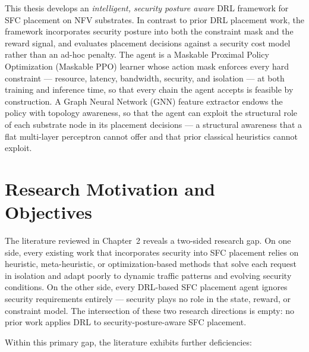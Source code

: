 This thesis develops an \emph{intelligent, security posture aware} DRL
framework for SFC placement on NFV substrates. In contrast to prior DRL
placement work, the framework incorporates security posture into both the constraint mask and the reward signal,
and evaluates placement decisions against a security cost model
rather than an ad-hoc penalty. The agent is a Maskable Proximal Policy
Optimization (Maskable PPO) learner whose action mask enforces every
hard constraint --- resource, latency, bandwidth, security, and
isolation --- at both training and inference time, so that every chain
the agent accepts is feasible by construction. A Graph Neural Network
(GNN) feature extractor endows the policy with topology awareness, so
that the agent can exploit the structural role of each substrate node
in its placement decisions --- a structural awareness that a flat
multi-layer perceptron cannot offer and that prior classical heuristics
cannot exploit.

\section{Research Motivation and Objectives}

The literature reviewed in Chapter~2 reveals a two-sided research
gap. On one side, every existing work that incorporates security into
SFC placement relies on heuristic, meta-heuristic, or
optimization-based methods that solve each request in isolation and
adapt poorly to dynamic traffic patterns and evolving security
conditions. On the other side, every DRL-based SFC placement agent
ignores security requirements entirely --- security plays no role in
the state, reward, or constraint model. The intersection of these two
research directions is empty: no prior work applies DRL to
security-posture-aware SFC placement.

Within this primary gap, the literature exhibits further deficiencies:

